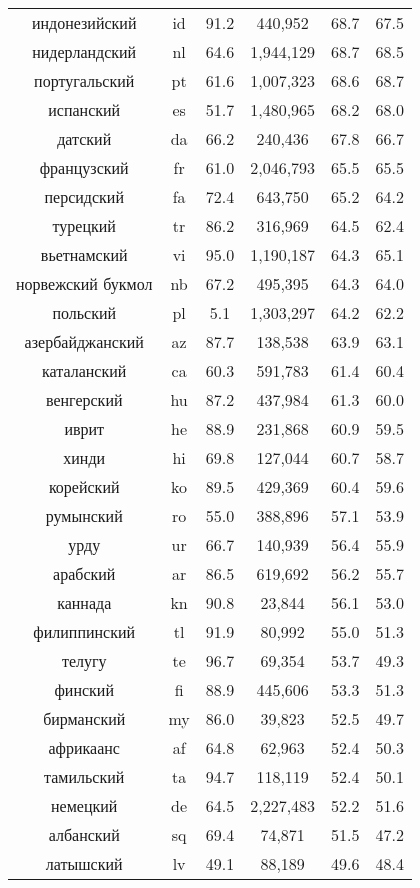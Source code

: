 \begin{table*}
{\begin{tabular}{|c|c|c||c|c|c|}
индонезийский & id & 91.2 & 440,952 & 68.7 & 67.5\\
нидерландский & nl & 64.6 & 1,944,129 & 68.7 & 68.5\\
португальский & pt & 61.6 & 1,007,323 & 68.6 & 68.7\\
испанский & es & 51.7 & 1,480,965 & 68.2 & 68.0\\
датский & da & 66.2 & 240,436 & 67.8 & 66.7\\
французский & fr & 61.0 & 2,046,793 & 65.5 & 65.5\\
персидский & fa & 72.4 & 643,750 & 65.2 & 64.2\\
турецкий & tr & 86.2 & 316,969 & 64.5 & 62.4\\
вьетнамский & vi & 95.0 & 1,190,187 & 64.3 & 65.1\\
норвежский букмол & nb & 67.2 & 495,395 & 64.3 & 64.0\\
польский & pl & 5.1 & 1,303,297 & 64.2 & 62.2\\
азербайджанский & az & 87.7 & 138,538 & 63.9 & 63.1\\
каталанский & ca & 60.3 & 591,783 & 61.4 & 60.4\\
венгерский & hu & 87.2 & 437,984 & 61.3 & 60.0\\
иврит & he & 88.9 & 231,868 & 60.9 & 59.5\\
хинди & hi & 69.8 & 127,044 & 60.7 & 58.7\\
корейский & ko & 89.5 & 429,369 & 60.4 & 59.6\\
румынский & ro & 55.0 & 388,896 & 57.1 & 53.9\\
урду & ur & 66.7 & 140,939 & 56.4 & 55.9\\
арабский & ar & 86.5 & 619,692 & 56.2 & 55.7\\
каннада & kn & 90.8 & 23,844 & 56.1 & 53.0\\
филиппинский & tl & 91.9 & 80,992 & 55.0 & 51.3\\
телугу & te & 96.7 & 69,354 & 53.7 & 49.3\\
финский & fi & 88.9 & 445,606 & 53.3 & 51.3\\
бирманский & my & 86.0 & 39,823 & 52.5 & 49.7\\
африкаанс & af & 64.8 & 62,963 & 52.4 & 50.3\\
тамильский & ta & 94.7 & 118,119 & 52.4 & 50.1\\
немецкий & de & 64.5 & 2,227,483 & 52.2 & 51.6\\
албанский & sq & 69.4 & 74,871 & 51.5 & 47.2\\
латышский & lv & 49.1 & 88,189 & 49.6 & 48.4\\

\end{tabular}}
\end{table*}
